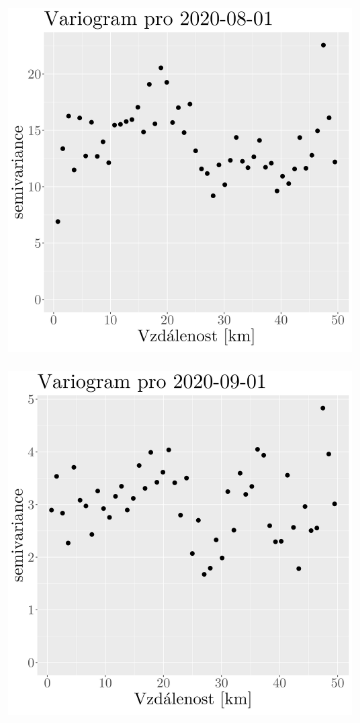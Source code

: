 \begin{figure}
\begin{subfigure}{0.30\textwidth}
		\caption{}
		\label{fig:variogram7}
	\end{subfigure}
\hfill
	\begin{subfigure}{0.30\textwidth}
		\includegraphics[width=\textwidth]{img/ch2/variograms/variogram_max15cm8.png}
		\caption{}
		\label{fig:variogram8}
	\end{subfigure}
\hfill
	\begin{subfigure}{0.30\textwidth}
		\includegraphics[width=\textwidth]{img/ch2/variograms/variogram_max15cm9.png}

\end{subfigure}
\end{figure}
